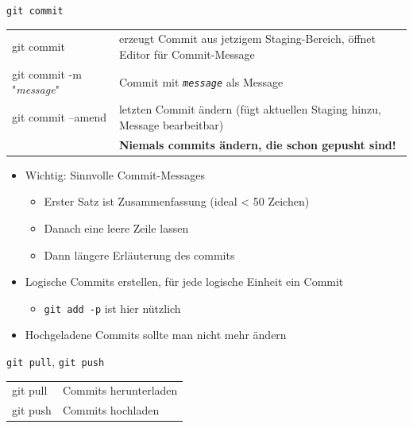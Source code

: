 \begin{frame}{\texttt{git commit}}
  \begin{tabu}{>{\ttfamily}l X[,L]}
    git commit                       & erzeugt Commit aus jetzigem Staging-Bereich, öffnet Editor für Commit-Message \\
    git commit -m "\textit{message}" & Commit mit \texttt{\textit{message}} als Message \\
    git commit --amend               & letzten Commit ändern (fügt aktuellen Staging hinzu, Message bearbeitbar) \\
    & \alert{\bfseries Niemals commits ändern, die schon gepusht sind!}
  \end{tabu}

  \begin{itemize}
    \item Wichtig: Sinnvolle Commit-Messages
      \begin{itemize}
        \item Erster Satz ist Zusammenfassung (ideal < 50 Zeichen)
        \item Danach eine leere Zeile lassen
        \item Dann längere Erläuterung des commits
      \end{itemize}
    \item Logische Commits erstellen, für jede logische Einheit ein Commit
      \begin{itemize}
        \item \texttt{git add -p} ist hier nützlich
      \end{itemize}
    \item Hochgeladene Commits sollte man nicht mehr ändern
  \end{itemize}
\end{frame}

\begin{frame}{\texttt{git pull}, \texttt{git push}}
  \begin{tabu}{>{\ttfamily}l X[,L]}
    git pull          & Commits herunterladen \\
    git push          & Commits hochladen
  \end{tabu}
\end{frame}

